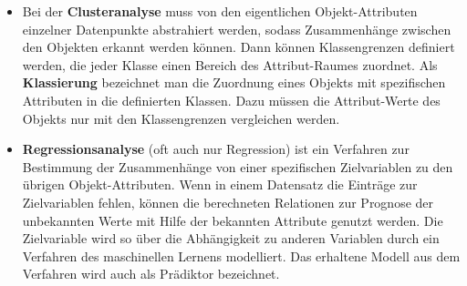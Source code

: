 \documentclass[
	twoside,
	12pt,
	a4paper,
	BCOR10mm,
	DIV14,
	listof=totoc,
	bibliography=totoc,
	headsepline
]{scrreprt}
\begin{document}
\begin{itemize}
\item Bei der \textbf{Clusteranalyse} muss von den eigentlichen Objekt-Attributen einzelner Datenpunkte abstrahiert werden, sodass Zusammenhänge zwischen den Objekten erkannt werden können. Dann können Klassengrenzen definiert werden, die jeder Klasse einen Bereich des Attribut-Raumes zuordnet.
Als \textbf{Klassierung} bezeichnet man die Zuordnung eines Objekts mit spezifischen Attributen in die definierten Klassen. Dazu müssen die Attribut-Werte des Objekts nur mit den Klassengrenzen vergleichen werden.
\item \textbf{Regressionsanalyse} (oft auch nur Regression) ist ein Verfahren zur Bestimmung der Zusammenhänge von einer spezifischen Zielvariablen zu den übrigen Objekt-Attributen. Wenn in einem Datensatz die Einträge zur Zielvariablen fehlen, können die berechneten Relationen zur Prognose der unbekannten Werte mit Hilfe der bekannten Attribute genutzt werden. Die Zielvariable wird so über die Abhängigkeit zu anderen Variablen durch ein Verfahren des maschinellen Lernens modelliert. Das erhaltene Modell aus dem Verfahren wird auch als Prädiktor bezeichnet. 	
\end{itemize}
\end{document}
